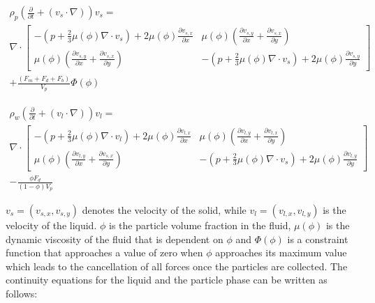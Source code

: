 \begin{multline} 
\rho_{p}\left(\frac{\partial}{\partial t}+(v_{s}\cdotp\nabla)\right)v_{s} = \\ \nabla\cdotp \begin{bmatrix} -\left(p+\frac{2}{3}\mu(\phi)\nabla\cdotp v_{s}\right)+2\mu(\phi)\frac{\partial v_{s,x}}{\partial x} & \mu(\phi)\left(\frac{\partial v_{s,y}}{\partial x}+\frac{\partial v_{s,x}}{\partial y}\right) \\ \mu(\phi)\left(\frac{\partial v_{s,y}}{\partial x}+\frac{\partial v_{s,x}}{\partial y}\right)  &  -\left(p+\frac{2}{3}\mu(\phi)\nabla\cdotp v_{s}\right)+2\mu(\phi)\frac{\partial v_{s,y}}{\partial y}\end{bmatrix}\\ + \frac{(F_{m}+F_{d}+F_{b})}{V_{p}}\Phi(\phi)
\label{eq:NS_part1}
\end{multline}

\begin{multline} 
\rho_{w}\left(\frac{\partial}{\partial t}+(v_{l}\cdotp\nabla)\right)v_{l} = \\ \nabla\cdotp \begin{bmatrix} -\left(p+\frac{2}{3}\mu(\phi)\nabla\cdotp v_{l}\right)+2\mu(\phi)\frac{\partial v_{l,x}}{\partial x} & \mu(\phi)\left(\frac{\partial v_{l,y}}{\partial x}+\frac{\partial v_{l,x}}{\partial y}\right) \\ \mu(\phi)\left(\frac{\partial v_{l,y}}{\partial x}+\frac{\partial v_{s,x}}{\partial y}\right)  &  -\left(p+\frac{2}{3}\mu(\phi)\nabla\cdotp v_{s}\right)+2\mu(\phi)\frac{\partial v_{l,y}}{\partial y}\end{bmatrix}\\ - \frac{\phi F_{d}}{(1-\phi)V_{p}}
\label{eq:NS_part2}
\end{multline}

$v_{s}=(v_{s,x},v_{s,y})$ denotes the velocity of the solid, while  $v_{l}=(v_{l,x},v_{l,y})$ is the velocity of the liquid. $\phi$ is the particle volume fraction in the fluid, $\mu(\phi)$ is the dynamic viscosity of the fluid that is dependent on $\phi$ and $\Phi(\phi)$ is a constraint function that approaches a value of zero when $\phi$ approaches its maximum value which leads to the cancellation of all forces once the particles are collected. The continuity equations for the liquid and the particle phase can be written as follows:  

